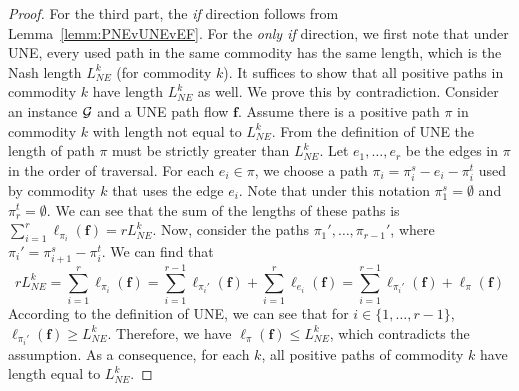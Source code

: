 \begin{proof}
For the third part, the \emph{if} direction follows from Lemma~\ref{lemm:PNEvUNEvEF}.  For the \emph{only if} direction, we first note that under UNE, every used path in the same commodity has the same length, which is the Nash length $L^k_{NE}$ (for commodity $k$).  It suffices to show that all positive paths in commodity $k$ have length $L^k_{NE}$ as well.  We prove this by contradiction.  Consider an instance $\mathcal{G}$ and a UNE path flow $\bm{f}$.  Assume there is a positive path $\pi$ in commodity $k$ with length not equal to $L_{NE}^k$. From the definition of UNE the length of path $\pi$ must be strictly greater than $L^k_{NE}$.  Let $e_1,\dots,e_r$ be the edges in $\pi$ in the order of traversal.  For each $e_i \in \pi$, we choose a path $\pi_i=\pi_i^s-e_i-\pi_i^t$ used by commodity $k$ that uses the edge $e_i$.  Note that under this notation $\pi_1^s=\emptyset$ and $\pi_r^t=\emptyset$. We can see that the sum of the lengths of these paths is $\sum_{i=1}^{r} \ell_{\pi_i}(\bm{f}) = rL^k_{NE}$. Now, consider the paths $\pi_1',\dots,\pi_{r-1}'$, where $\pi_i'=\pi_{i+1}^s-\pi_i^t$.  We can find that 
$$
rL^k_{NE}=\sum_{i=1}^{r} \ell_{\pi_i}(\bm{f}) = \sum_{i=1}^{r-1} \ell_{\pi_i'}(\bm{f}) + \sum_{i=1}^{r} \ell_{e_i}(\bm{f}) = \sum_{i=1}^{r-1} \ell_{\pi_i'}(\bm{f}) + \ell_{\pi}(\bm{f})
$$
According to the definition of UNE, we can see that for $i\in\{1,\dots,r-1\}$, $\ell_{\pi_i'}(\bm{f}) \ge L^k_{NE}$.  Therefore,  we have $\ell_{\pi}(\bm{f}) \le L^k_{NE}$, which contradicts the assumption. As a consequence, for each $k$, all positive paths of commodity $k$ have length equal to $L^k_{NE}$.

   
\end{proof}

